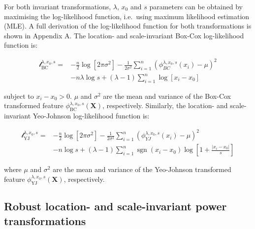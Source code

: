 \documentclass[preprint,12pt,authoryear]{elsarticle}
\DeclareMathOperator{\sgn}{sgn}
\begin{document}
For both invariant transformations, \(\lambda\), \(x_0\) and \(s\)
parameters can be obtained by maximising the log-likelihood function,
i.e.~using maximum likelihood estimation (MLE). A full derivation of the
log-likelihood function for both transformations is shown in Appendix A.
The location- and scale-invariant Box-Cox log-likelihood function is:

\begin{equation}
\label{eqn:box-cox-invariant-log-likelihood}
\begin{split}
\mathcal{l}_{\text{BC}}^{\lambda, x_0, s} = & -\frac{n}{2} \log \left[2 \pi \sigma^2 \right] -\frac{1}{2 \sigma^2} \sum_{i=1}^n \left( \phi_{BC}^{\lambda, x_0, s}(x_i) - \mu \right)^2 \\
& -n \lambda \log s + \left( \lambda - 1 \right) \sum_{i=1}^n \log \left[ x_i - x_0 \right]
\end{split}
\end{equation}

subject to \(x_i - x_0 > 0\). \(\mu\) and \(\sigma^2\) are the mean and
variance of the Box-Cox transformed feature
\(\phi_{\text{BC}}^{\lambda, x_0, s} (\mathbf{X})\), respectively.
Similarly, the location- and scale-invariant Yeo-Johnson log-likelihood
function is:

\begin{equation}
\label{eqn:yeo-johnson-invariant-log-likelihood}
\begin{split}
\mathcal{l}_{\text{YJ}}^{\lambda, x_0, s} = & -\frac{n}{2} \log\left[2 \pi \sigma^2\right] -\frac{1}{2 \sigma^2} \sum_{i=1}^n \left( \phi_{YJ}^{\lambda, x_0, s}(x_i) - \mu \right)^2 \\
& - n \log s + (\lambda - 1) \sum_{i=1}^n \sgn(x_i - x_0) \log \left[1 + \frac{|x_i - x_0|}{s} \right]
\end{split}
\end{equation}

where \(\mu\) and \(\sigma^2\) are the mean and variance of the
Yeo-Johnson transformed feature
\(\phi_{\text{YJ}}^{\lambda, x_0, s} (\mathbf{X})\), respectively.

\subsection{Robust location- and scale-invariant power
transformations}\label{robust-location--and-scale-invariant-power-transformations}
\end{document}
